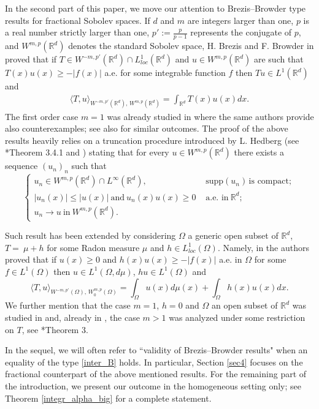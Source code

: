 \documentclass[letterpaper, 11pt,  reqno]{amsart}
\theoremstyle{definition}
\theoremstyle{remark}
\numberwithin{equation}{section}
\newcommand{\R}{{\mathbb R}}
\begin{document}
In the second part of this paper, we move our attention to Brezis--Browder type results for fractional Sobolev spaces. If  $d$ and $m$ are integers larger than one, $p$ is a real number strictly larger than one, $p':=\frac{p}{p-1}$ represents the conjugate of $p$, and $W^{m,p}(\R^d)$ denotes the standard Sobolev space,  H. Brezis and F. Browder in \cite{1982} proved that if $T\in W^{-m,p'}(\R^d)\cap L^1_{loc}(\R^d)$ and $u\in W^{m,p}(\R^d)$ are such that $T(x)u(x)\ge -|f(x)|$ a.e. for some integrable function $f$ then $Tu\in L^1(\R^d)$ and 
\begin{align}
\label{inter_B}
\langle T,u \rangle_{W^{-m,p'}(\R^d),\, W^{m,p}(\R^d)}=\int_{\R^d}T(x)u(x)dx.
\end{align}
The first order case $m=1$ was already studied in  \cite{cartan} where the same authors provide also counterexamples; see also \cite{1984} for similar outcomes.
The proof of the above results heavily relies on a truncation procedure introduced by L. Hedberg (see \cite{Adams}*{Theorem 3.4.1} and \cite{Hedbger})  stating that for every $u\in W^{m,p}(\R^d)$ there exists a sequence $(u_n)_n$  such that 
$$ \begin{cases} u_n\in W^{m,p}(\R^d)\cap L^{\infty}(\R^d), & \,\,\text{supp}(u_n)\, \mbox{is compact}; \\ |u_n(x)|\le |u(x)|\ \mbox{and}\ u_n(x)u(x)\ge 0 & \mbox{ a.e. in}\ \R^d; \\
	u_n\to u\ \mbox{in}\ W^{m,p}(\R^d).& 
\end{cases}
$$

\noindent
Such result has been extended by considering $\Omega$ a  generic open subset of $\R^d$, $T=~{\mu+h}$ for some Radon measure $\mu$ and  $h\in L^1_{loc}(\Omega)$. Namely, in \cite{1990} the authors proved that if $u(x)\ge 0$ and 
$h(x)u(x)\ge -|f(x)|$ a.e. in $\Omega$ for some $f\in L^1(\Omega)$ then $u\in L^{1}(\Omega, d\mu)$, $hu\in L^1(\Omega)$ and 
$$\langle T,u \rangle_{W^{-m,p'}(\Omega),\, W^{m,p}_0(\Omega)}=\int_{\Omega}u(x)d\mu(x)+\int_{\Omega}h(x)u(x)dx.$$
We further mention that  the case $m=1$, $h=0$ and $\Omega$ an open subset of $\R^d$ was studied in \cite{cartan} and, already  in \cite{1982},  the case $m>1$ was analyzed under some restriction on $T$, see \cite{1982}*{Theorem 3}. 

In the sequel, we will often refer to ``validity of Brezis--Browder results" when an equality of the type \eqref{inter_B} holds.  In particular,  Section \ref{sec4} focuses on the fractional counterpart of the above mentioned results. For the remaining part of the introduction, we present our outcome in the homogeneous setting only; see Theorem \ref{integr_alpha_big} for a complete statement.  
\end{document}

